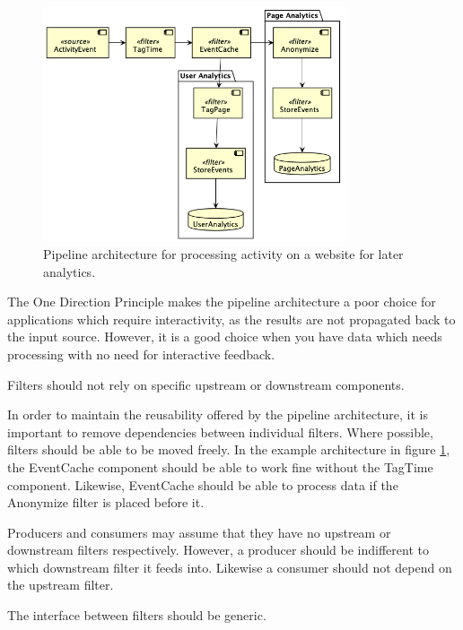\begin{figure}
    \centering
    \includegraphics[width=0.8\textwidth]{diagrams/activity-tracking.png}
    \caption{Pipeline architecture for processing activity on a website for later analytics.}
    \label{fig:analytics}
\end{figure}

The One Direction Principle makes the pipeline architecture a poor choice for applications which require interactivity,
as the results are not propagated back to the input source.
However, it is a good choice when you have data which needs processing with no need for interactive feedback.

\begin{definition}\label{independent}
Filters should not rely on specific upstream or downstream components.
\end{definition}

In order to maintain the reusability offered by the pipeline architecture,
it is important to remove dependencies between individual filters.
Where possible, filters should be able to be moved freely.
In the example architecture in figure \ref{fig:analytics},
the EventCache component should be able to work fine without
the TagTime component.
Likewise, EventCache should be able to process data if the
Anonymize filter is placed before it.

Producers and consumers may assume that they have no upstream or downstream filters respectively.
However, a producer should be indifferent to which downstream filter it feeds into.
Likewise a consumer should not depend on the upstream filter.

\begin{corollary}\label{interface}
    The interface between filters should be generic.
\end{corollary}

